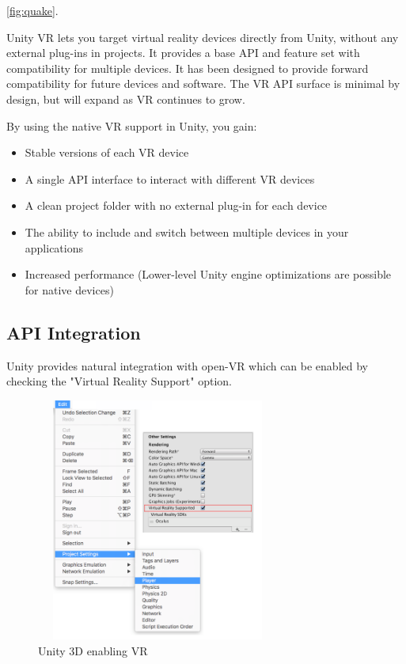 \documentclass[journal]{IEEEtran}
\begin{document}
\begin{figure}[h!]
	\noindent
\end{figure}
\ref{fig:quake}.

Unity VR lets you target virtual reality devices directly from Unity, without any external plug-ins in projects. It provides a base API and feature set with compatibility for multiple devices. It has been designed to provide forward compatibility for future devices and software. The VR API surface is minimal by design, but will expand as VR continues to grow.


By using the native VR support in Unity, you gain:
\begin{itemize}
\item Stable versions of each VR device
\item A single API interface to interact with different VR devices
\item A clean project folder with no external plug-in for each device
\item The ability to include and switch between multiple devices in your applications
\item Increased performance (Lower-level Unity engine optimizations are possible for native devices)
\end{itemize}

\subsection{API Integration}
Unity provides natural integration with open-VR which can be enabled by checking the "Virtual Reality Support" option.

\begin{figure}[h]
	\includegraphics[width=8cm, height=8cm]{unity} 
	\centering
	\caption{Unity 3D enabling VR \label{fig:unity} \cite{unity}}
\end{figure}
\end{document}
